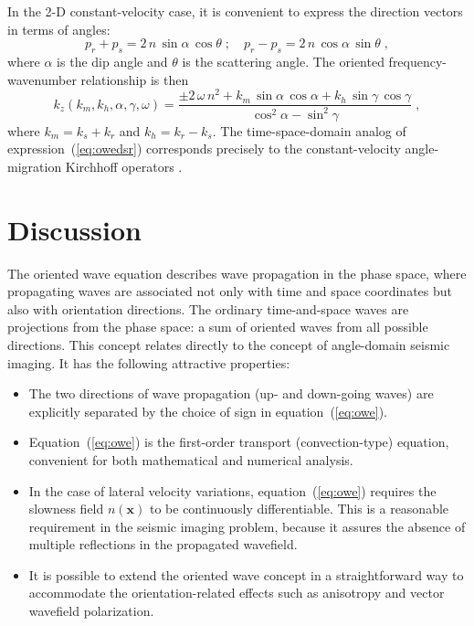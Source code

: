 In the 2-D constant-velocity case, it is convenient to express the direction
vectors in terms of angles: 
\begin{equation}
  \label{eq:angles}
p_r + p_s = 2\,n\,\sin{\alpha}\,\cos{\theta}\;;\quad
p_r - p_s = 2\,n\,\cos{\alpha}\,\sin{\theta}\;,  
\end{equation}
where $\alpha$ is the dip angle and $\theta$ is the scattering angle. The
oriented frequency-wavenumber relationship is then
\begin{equation}
  \label{eq:owedsr}
  k_z(k_m,k_h,\alpha,\gamma,\omega) = 
  \frac{\pm 2\,\omega\,n^2 + k_m\,\sin{\alpha}\,\cos{\alpha} +
    k_h\,\sin{\gamma}\,\cos{\gamma}}{\cos^2{\alpha}-\sin^2{\gamma}}\;,
\end{equation}
where $k_m = k_s + k_r$ and $k_h = k_r - k_s$. The time-space-domain analog of
expression~(\ref{eq:owedsr}) corresponds precisely to the constant-velocity
angle-migration Kirchhoff operators \cite[]{paul}.

\section{Discussion}

The oriented wave equation describes wave propagation in the phase space,
where propagating waves are associated not only with time and space
coordinates but also with orientation directions. The ordinary time-and-space
waves are projections from the phase space: a sum of oriented waves from all
possible directions. This concept relates directly to the concept of
angle-domain seismic imaging. It has the following attractive properties:
\begin{itemize}
\item The two directions of wave propagation (up- and down-going waves) are
  explicitly separated by the choice of sign in equation~(\ref{eq:owe}).
\item Equation~(\ref{eq:owe}) is the first-order transport
  (con\-ve\-cti\-on-type) equation, convenient for both mathematical and
  numerical analysis.
\item In the case of lateral velocity variations, equation~(\ref{eq:owe})
  requires the slowness field $n(\mathbf{x})$ to be continuously
  differentiable. This is a reasonable requirement in the seismic imaging
  problem, because it assures the absence of multiple reflections in the
  propagated wavefield.
\item It is possible to extend the oriented wave concept in a straightforward
  way to accommodate the orientation-related effects such as anisotropy and
  vector  wavefield polarization.
\end{itemize}

